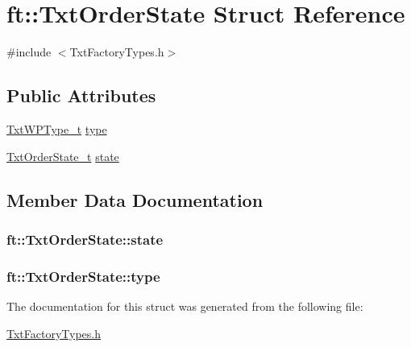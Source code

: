 \hypertarget{structft_1_1_txt_order_state}{}\section{ft\+:\+:Txt\+Order\+State Struct Reference}
\label{structft_1_1_txt_order_state}


{\ttfamily \#include $<$Txt\+Factory\+Types.\+h$>$}

\subsection*{Public Attributes}
\begin{DoxyCompactItemize}
\item 
\hyperlink{namespaceft_a2d5bf01b2da29de3c061682f3195b5b2}{Txt\+W\+P\+Type\+\_\+t} \hyperlink{structft_1_1_txt_order_state_a52dbd5afe5eafa36d1892bd66514dd2a}{type}
\item 
\hyperlink{namespaceft_a0b621af47c2875bbecb5f4a3d4218a5c}{Txt\+Order\+State\+\_\+t} \hyperlink{structft_1_1_txt_order_state_a2d088544a4d9a5213db0bd3d6f4d89de}{state}
\end{DoxyCompactItemize}


\subsection{Member Data Documentation}
\subsubsection[{\texorpdfstring{state}{state}}]{ ft\+::\+Txt\+Order\+State\+::state}\hypertarget{structft_1_1_txt_order_state_a2d088544a4d9a5213db0bd3d6f4d89de}{}\label{structft_1_1_txt_order_state_a2d088544a4d9a5213db0bd3d6f4d89de}
\subsubsection[{\texorpdfstring{type}{type}}]{ ft\+::\+Txt\+Order\+State\+::type}\hypertarget{structft_1_1_txt_order_state_a52dbd5afe5eafa36d1892bd66514dd2a}{}\label{structft_1_1_txt_order_state_a52dbd5afe5eafa36d1892bd66514dd2a}


The documentation for this struct was generated from the following file\+:\begin{DoxyCompactItemize}
\item 
\hyperlink{_txt_factory_types_8h}{Txt\+Factory\+Types.\+h}\end{DoxyCompactItemize}
